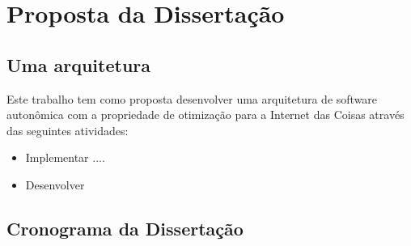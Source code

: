 \chapter{Proposta da Dissertação}

\section{Uma arquitetura}

Este trabalho tem como proposta desenvolver uma arquitetura de software autonômica com a propriedade de otimização para a Internet das Coisas através das seguintes atividades:

\begin{itemize}
\item Implementar ....
\item Desenvolver
\end{itemize}


\section{Cronograma da Dissertação}

